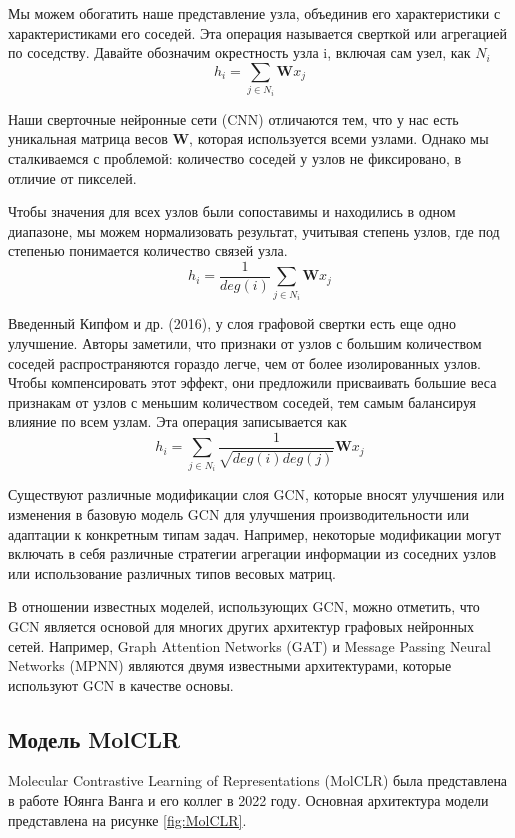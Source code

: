Мы можем обогатить наше представление узла, объединив его характеристики с характеристиками его соседей. Эта операция называется сверткой или агрегацией по соседству. Давайте обозначим окрестность узла i, включая сам узел, как $N_{i}$
$$h_{i} = \sum_{j \in N_{i}}\mathbf{W}x_{j}$$

Наши сверточные нейронные сети (CNN) отличаются тем, что у нас есть уникальная матрица весов $\mathbf{W}$, которая используется всеми узлами. Однако мы сталкиваемся с проблемой: количество соседей у узлов не фиксировано, в отличие от пикселей.

Чтобы значения для всех узлов были сопоставимы и находились в одном диапазоне, мы можем нормализовать результат, учитывая степень узлов, где под степенью понимается количество связей узла.
$$h_{i} = \frac{1}{deg(i)} \sum_{j \in N_{i}}\mathbf{W}x_{j}$$

Введенный Кипфом и др. (2016), у слоя графовой свертки есть еще одно улучшение.
Авторы заметили, что признаки от узлов с большим количеством соседей распространяются гораздо легче, чем от более изолированных узлов. Чтобы компенсировать этот эффект, они предложили присваивать большие веса признакам от узлов с меньшим количеством соседей, тем самым балансируя влияние по всем узлам. Эта операция записывается как
\begin{equation}
h_{i} = \sum_{j \in N_{i}} \frac{1}{\sqrt{deg(i)deg(j)}} \mathbf{W}x_{j}
\end{equation}

Существуют различные модификации слоя GCN, которые вносят улучшения или изменения в базовую модель GCN для улучшения производительности или адаптации к конкретным типам задач. Например, некоторые модификации могут включать в себя различные стратегии агрегации информации из соседних узлов или использование различных типов весовых матриц.

В отношении известных моделей, использующих GCN, можно отметить, что GCN является основой для многих других архитектур графовых нейронных сетей. Например, Graph Attention Networks (GAT) \cite{veličković2018graph} и Message Passing Neural Networks (MPNN) \cite{maskey2022generalization} являются двумя известными архитектурами, которые используют GCN в качестве основы.


\subsection{Модель MolCLR}
Molecular Contrastive Learning of Representations (MolCLR) \cite{molclr} была представлена в работе Юянга Ванга и его коллег в 2022 году. Основная архитектура модели представлена на рисунке \ref{fig:MolCLR}.

